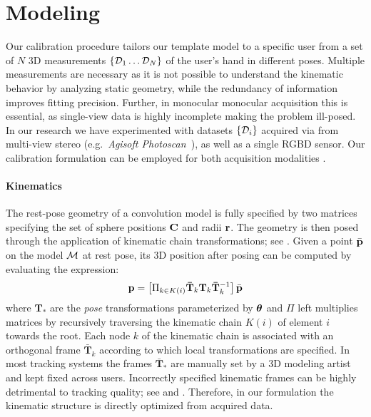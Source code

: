 
\section{Modeling}
\label{sec:modeling}

Our calibration procedure tailors our template model to a specific user from a set of $N$ 3D measurements $\{ \mathcal{D}_1 \dots \mathcal{D}_N \}$ of the user's hand in different poses. Multiple measurements are necessary as it is not possible to understand the kinematic behavior by analyzing static geometry, while the redundancy of information improves fitting precision. Further, in monocular monocular acquisition this is essential, as single-view data is highly incomplete making the problem ill-posed. In our research we have experimented with datasets $\{\mathcal{D}_i\}$ acquired via from multi-view stereo (e.g.\ \emph{Agisoft Photoscan~\textcopyright}), as well as a single RGBD sensor. Our calibration formulation can be employed for both acquisition modalities .


\paragraph{Kinematics}
The rest-pose geometry of a convolution model is fully specified by two matrices specifying the set of sphere positions ${\mathbf{C}}$ and radii ${\mathbf{r}}$. The geometry is then posed through the application of  kinematic chain transformations; see . Given a point $\bar{\mathbf{p}}$ on the model $\mathcal{M}$ at rest pose, its 3D position after posing can be computed by evaluating the expression:
% 
\begin{equation}
\mathbf{p} = \left[ \Pi_{k \in K(i)} \mathbf{\bar{T}}_k \mathbf{T}_k \mathbf{\bar{T}}_k^{-1} \right] \bar{\mathbf{p}}
\label{eq:kinematic}
\end{equation}
%
where $\mathbf{T}_*$ are the \emph{pose} transformations parameterized by $\boldsymbol{\theta}$ and $\Pi$ left multiplies matrices by recursively traversing the kinematic chain $K(i)$ of element $i$ towards the root. Each node $k$ of the kinematic chain is associated with an orthogonal frame $\mathbf{\bar{T}}_k$ according to which local transformations are specified. In most tracking systems the frames $\mathbf{\bar{T}}_*$ are manually set by a 3D modeling artist and kept fixed across users. Incorrectly specified kinematic frames can be highly detrimental to tracking quality; see  and . Therefore, in our formulation the kinematic structure is directly optimized from acquired data.

